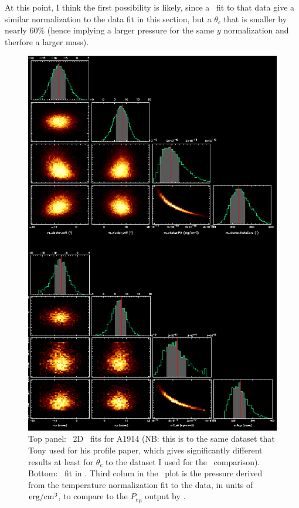 At this point, I think the first possibility is likely, since a
\nagaimodel\ fit to that data give a similar normalization to the data
fit in this section, but a $\theta_c$ that is smaller by nearly $60\%$
(hence implying a larger pressure for the same
$y$ normalization and therfore a larger mass).

\newpage
\begin{figure}[th]
\begin{center}
\includegraphics[scale=0.4]{figures/climax_markov_nagai_comp.png}
\end{center}
\caption{Top panel: \climax\ 2D \nagaimodel\ fits for A1914 (NB: this
  is to the same dataset that Tony used for his profile paper, which
  gives significantly different results at least for $\theta_c$ to the
  dataset I used for the \betamodel\ comparison).  Bottom:
  \nagaimodel\ fit in \markov.  Third colum in the \climax\ plot is
  the pressure derived from the temperature normalization fit to the
  data, in units of ${\rm erg/cm^3}$, to compare to the ${P_{e}}_0$ output by \markov.}
\label{fig:nagaicomp}
\end{figure}
